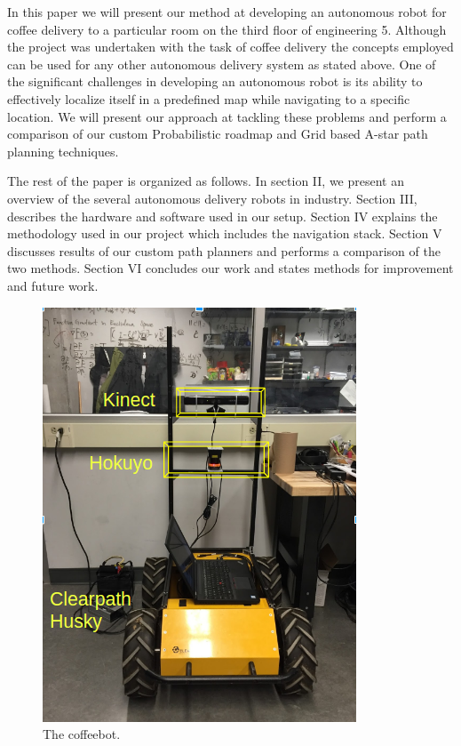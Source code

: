 \documentclass[letterpaper, 10 pt, conference]{ieeeconf}  %
\begin{document}
In this paper we will present our method at developing an autonomous robot for coffee delivery to a particular room on the third floor of engineering 5. Although the project was undertaken with the task of coffee delivery the concepts employed can be used for any other autonomous delivery system as stated above. One of the significant challenges in developing an autonomous robot is its ability to effectively localize itself in a predefined map while navigating to a specific location. We will present our approach at tackling these problems and perform a comparison of our custom Probabilistic roadmap and Grid based A-star path planning techniques.

The rest of the paper is organized as follows. In section II, we present an overview of the several autonomous delivery robots in industry. Section III, describes the hardware and software used in our setup. Section IV explains the methodology used in our project which includes the navigation stack. Section V discusses results of our custom path planners and performs a comparison of the two methods. Section VI concludes our work and states methods for improvement and future work.

\begin{figure}[!ht]
	\centering
	\includegraphics[width=1.0\columnwidth]{Figures/hardware_setup}
	\caption{The coffeebot.}
	\label{hardware}
\end{figure}
\end{document}
